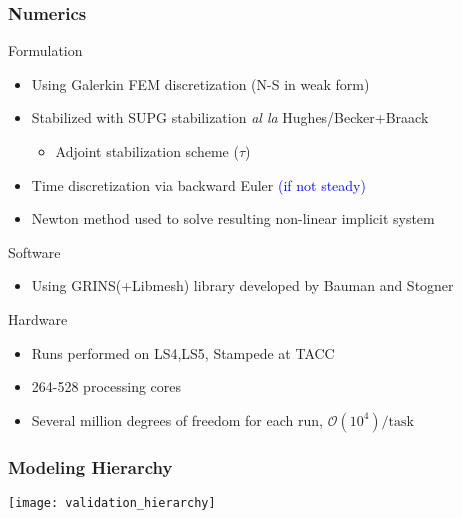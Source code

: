 \documentclass[mathserif]{beamer}
\begin{document}
%
%
%
\begin{frame}
  \frametitle{Numerics}
  \begin{block}{Formulation}
    \begin{itemize}
    \item Using Galerkin FEM discretization (N-S in weak form)
    \item Stabilized with SUPG stabilization \textit{al la} Hughes/Becker+Braack
      \begin{itemize}
      \item Adjoint stabilization scheme ($\tau$)
      \end{itemize}
    \item Time discretization via backward Euler \textcolor{blue}{(if not steady)}
    \item Newton method used to solve resulting non-linear implicit system
    \end{itemize}
  \end{block}

  \begin{block}{Software}
    \begin{itemize}
    \item Using GRINS(+Libmesh) library developed by Bauman and Stogner
    \end{itemize}
  \end{block}

  \begin{block}{Hardware}
    \begin{itemize}
    \item Runs performed on LS4,LS5, Stampede at TACC
    \item 264-528 processing cores
    \item Several million degrees of freedom for each run, $\mathcal{O}(10^4)/\text{task}$ 
    \end{itemize}
  \end{block}

\end{frame}


%
%
%
\begin{frame}
  \frametitle{Modeling Hierarchy}

    \begin{center}
    \texttt{[image: validation\_hierarchy]}
   \end{center}

\end{frame}
\end{document}

